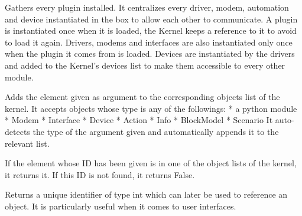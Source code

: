 \documentclass[letterpaper,10pt,english]{sphinxmanual}
\begin{document}
\begin{fulllineitems}
\label{api/kernel:kernel.Kernel}
Gathers every plugin installed. 
It centralizes every driver, modem, automation and device 
instantiated in the box to allow each other to communicate.
A plugin is instantiated once when it is loaded, the Kernel 
keeps a reference to it to avoid to load it again.
Drivers, modems and interfaces are also instantiated 
only once when the plugin it comes from is loaded.
Devices are instantiated by the drivers and added to the
Kernel's devices list to make them accessible to every 
other module.

\begin{fulllineitems}
\label{api/kernel:kernel.Kernel.add_to_kernel}
Adds the element given as argument to the corresponding objects
list of the kernel. It accepts objects whose type is any of the 
followings:
* a python module
* Modem
* Interface
* Device
* Action
* Info
* BlockModel
* Scenario
It auto-detects the type of the argument given and automatically 
appends it to the relevant list.

\end{fulllineitems}


\begin{fulllineitems}
\label{api/kernel:kernel.Kernel.get_by_id}
If the element whose ID has been given is in one of the
object lists of the kernel, it returns it. If this ID is not 
found, it returns False.

\end{fulllineitems}


\begin{fulllineitems}
\label{api/kernel:kernel.Kernel.get_new_id}
Returns a unique identifier of type int which can later be used
to reference an object. It is particularly useful when it comes
to user interfaces.

\end{fulllineitems}



\end{fulllineitems}
\end{document}
